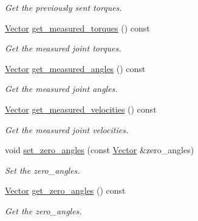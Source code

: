 \begin{DoxyCompactItemize}
\begin{DoxyCompactList}\small\item\em Get the previously sent torques. \end{DoxyCompactList}\item 
\hyperlink{classblmc__robots_1_1BlmcJointModules_abaff382c6fd4b494ec0c17498d94919e}{Vector} \hyperlink{classblmc__robots_1_1BlmcJointModules_a24e9a88d03b45f08f9ce0decce7403c0}{get\+\_\+measured\+\_\+torques} () const
\begin{DoxyCompactList}\small\item\em Get the measured joint torques. \end{DoxyCompactList}\item 
\hyperlink{classblmc__robots_1_1BlmcJointModules_abaff382c6fd4b494ec0c17498d94919e}{Vector} \hyperlink{classblmc__robots_1_1BlmcJointModules_abe68677ccf4bdbea975210dcd1de2fdc}{get\+\_\+measured\+\_\+angles} () const
\begin{DoxyCompactList}\small\item\em Get the measured joint angles. \end{DoxyCompactList}\item 
\hyperlink{classblmc__robots_1_1BlmcJointModules_abaff382c6fd4b494ec0c17498d94919e}{Vector} \hyperlink{classblmc__robots_1_1BlmcJointModules_a6138e9e42ce53ce9c5fc7728c5c51558}{get\+\_\+measured\+\_\+velocities} () const
\begin{DoxyCompactList}\small\item\em Get the measured joint velocities. \end{DoxyCompactList}\item 
void \hyperlink{classblmc__robots_1_1BlmcJointModules_abc94960666d33b6a5071d4cf25f7794d}{set\+\_\+zero\+\_\+angles} (const \hyperlink{classblmc__robots_1_1BlmcJointModules_abaff382c6fd4b494ec0c17498d94919e}{Vector} \&zero\+\_\+angles)
\begin{DoxyCompactList}\small\item\em Set the zero\+\_\+angles. \end{DoxyCompactList}\item 
\hyperlink{classblmc__robots_1_1BlmcJointModules_abaff382c6fd4b494ec0c17498d94919e}{Vector} \hyperlink{classblmc__robots_1_1BlmcJointModules_a443404bd864cd2d552e92238a385061a}{get\+\_\+zero\+\_\+angles} () const
\begin{DoxyCompactList}\small\item\em Get the zero\+\_\+angles. \end{DoxyCompactList}\item 

\end{DoxyCompactItemize}
